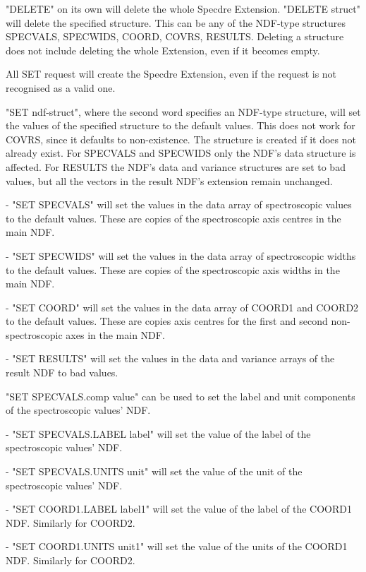\begin{description}
   "DELETE" on its own will delete the whole Specdre Extension.
   "DELETE struct" will delete the specified structure. This can be
   any of the NDF-type structures SPECVALS, SPECWIDS, COORD,
   COVRS, RESULTS. Deleting a structure does not include deleting
   the whole Extension, even if it becomes empty.

   All SET request will create the Specdre Extension, even if the
   request is not recognised as a valid one.

   "SET ndf-struct", where the second word specifies an NDF-type
   structure, will set the values of the specified structure to
   the default values. This does not work for COVRS, since it
   defaults to non-existence. The structure is created if it does
   not already exist. For SPECVALS and SPECWIDS only the NDF's data
   structure is affected. For RESULTS the NDF's data and variance
   structures are set to bad values, but all the vectors in the
   result NDF's extension remain unchanged.

   -  "SET SPECVALS" will set the values in the data array of
      spectroscopic values to the default values. These are copies
      of the spectroscopic axis centres in the main NDF.

   -  "SET SPECWIDS" will set the values in the data array of
      spectroscopic widths to the default values. These are copies
      of the spectroscopic axis widths in the main NDF.

   -  "SET COORD" will set the values in the data array of
      COORD1 and COORD2 to the default values. These are copies
      axis centres for the first and second non-spectroscopic axes
      in the main NDF.

   -  "SET RESULTS" will set the values in the data and variance
      arrays of the result NDF to bad values.

   "SET SPECVALS.comp value" can be used to set the label and unit
   components of the spectroscopic values' NDF.

   -  "SET SPECVALS.LABEL label" will set the value of the label
      of the spectroscopic values' NDF.

   -  "SET SPECVALS.UNITS unit" will set the value of the unit of
      the spectroscopic values' NDF.

   -  "SET COORD1.LABEL label1" will set the value of the label
      of the COORD1 NDF. Similarly for COORD2.

   -  "SET COORD1.UNITS unit1" will set the value of the units of
      the COORD1 NDF. Similarly for COORD2.


\end{description}
